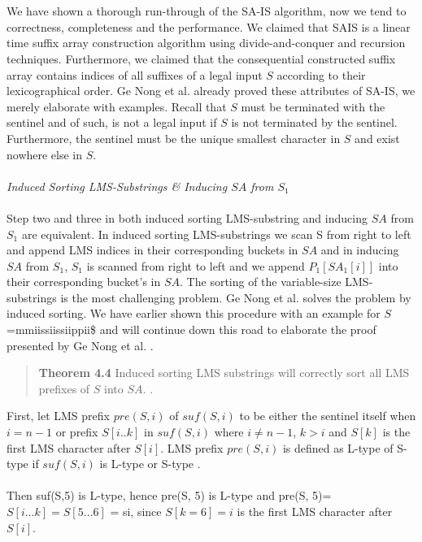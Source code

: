 \documentclass[12pt]{article} %
\begin{document}
\\ \\
We have shown a thorough run-through of the SA-IS algorithm, now we tend to correctness, completeness and the performance. We claimed that SAIS is a linear time suffix array construction algorithm using divide-and-conquer and recursion techniques. Furthermore, we claimed that the consequential constructed suffix array contains indices of all suffixes of a legal input $S$ according to their lexicographical order. Ge Nong et al. \cite{twoeffecient} already proved these attributes of SA-IS, we merely elaborate with examples. Recall that $S$ must be terminated with the sentinel and of such, is not a legal input if $S$ is not terminated by the sentinel. Furthermore, the sentinel must be the unique smallest character in $S$ and exist nowhere else in $S$.  
\\ \\
\textit{Induced Sorting LMS-Substrings \& Inducing $SA$ from $S_1$ }
\\ \\
Step two and three in both induced sorting LMS-substring and inducing $SA$ from $S_1$ are equivalent. In induced sorting LMS-substrings we scan S from right to left and append LMS indices in their corresponding buckets in $SA$ and in inducing $SA$ from $S_1$, $S_1$ is scanned from right to left and we append $P_1[SA_1[i]]$ into their corresponding bucket's in $SA$.
The sorting of the variable-size LMS-substrings is the most challenging problem. Ge Nong et al. \cite{twoeffecient} solves the problem by induced sorting. We have earlier shown this procedure with an example for $S$=mmiissiissiippii\$ and will continue down this road to elaborate the proof presented by Ge Nong et al. \cite{twoeffecient}.
\begin{quote}
\textbf{Theorem 4.4} Induced sorting LMS substrings will correctly sort all LMS prefixes of $S$ into $SA$. \cite{twoeffecient}.
\end{quote}
First, let LMS prefix $pre(S, i)$ of $suf(S, i)$ to be either the sentinel itself when $i = n-1$ or prefix $S[i..k]$ in $suf(S, i)$ where $i \neq n-1$, $k > i$ and $S[k]$ is the first LMS character after $S[i]$. LMS prefix $pre(S,i)$ is defined as L-type of S-type if $suf(S, i)$ is L-type or S-type \cite{twoeffecient}.
\\ \\
Then suf(S,5) is L-type, hence pre(S, 5) is L-type and pre(S, 5)=$S[i \ldots k] = S[5 \ldots 6]$ = si, since $S[k=6]=i$ is the first LMS character after $S[i]$. 
\\ \\
\end{document}
